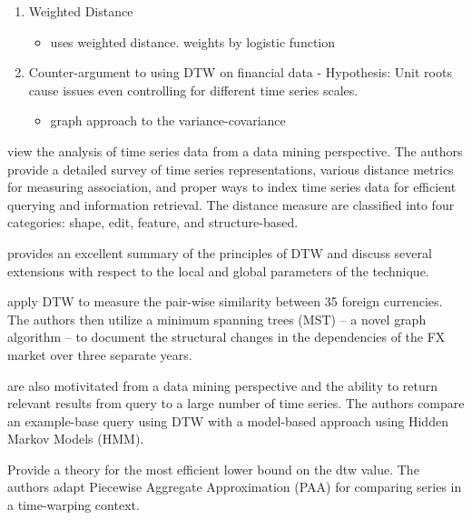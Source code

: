 \documentclass[12pt]{article}
\begin{document}
\begin{enumerate}
\begin{itemize}
    \end{itemize}
    \item Weighted Distance
    \begin{itemize}
        \item \parencite{JEONG20112231} uses weighted distance. weights by logistic function
    \end{itemize}
    \item Counter-argument to using DTW on financial data - Hypothesis: Unit roots cause issues even controlling for different time series scales.
    \begin{itemize}
        \item \parencite{9145837_Entropic_DTW_Fin_Networks} graph approach to the variance-covariance 
    \end{itemize}
\end{enumerate}

\parencite{ElsingAgon2012} view the analysis of time series data from a data mining perspective. The authors provide a detailed survey of time series representations, various distance metrics for measuring association, and proper ways to index time series data for efficient querying and information retrieval. The distance measure are classified into four categories: shape, edit, feature, and structure-based.


\parencite{Mueller2007} provides an excellent summary of the principles of DTW and discuss several extensions with respect to the local and global parameters of the technique.





\parencite{WangXieHanSun2012} apply DTW to measure the pair-wise similarity between 35 foreign currencies. The authors then utilize a minimum spanning trees (MST) -- a novel graph algorithm -- to document the structural changes in the dependencies of the FX market over three separate years.

\parencite{KotsifakosAthitsosPapapetrou_2011} are also motivitated from a data mining perspective and the ability to return relevant results from query to a large number of time series. The authors compare an example-base query using DTW with a model-based approach using Hidden Markov Models (HMM).

\parencite{KeoghRatanamahatana_2005} Provide a theory for the most efficient lower bound on the dtw value. The authors adapt Piecewise Aggregate Approximation (PAA) for comparing series in a time-warping context.
\end{document}
